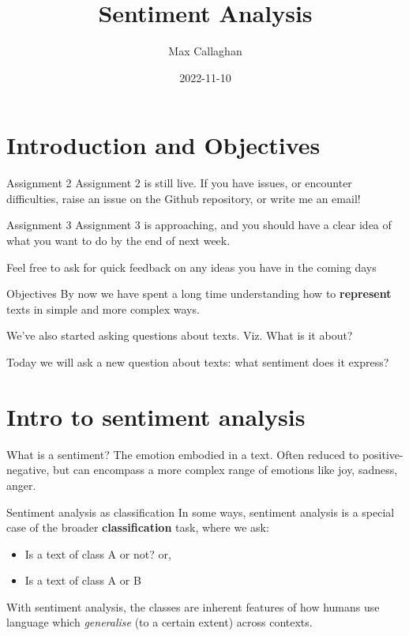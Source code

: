 \documentclass[
  10pt,
  ignorenonframetext,
  aspectratio=169]{beamer}
\title{Sentiment Analysis}
\author{Max Callaghan}
\date{2022-11-10}
\providecommand{\tightlist}{%
  \setlength{\itemsep}{0pt}\setlength{\parskip}{0pt}}
\begin{document}
\frame{\titlepage}

\hypertarget{introduction-and-objectives}{%
\section{Introduction and
Objectives}\label{introduction-and-objectives}}

\begin{frame}{Assignment 2}
\protect\hypertarget{assignment-2}{}
Assignment 2 is still live. If you have issues, or encounter
difficulties, raise an issue on the Github repository, or write me an
email!
\end{frame}

\begin{frame}{Assignment 3}
\protect\hypertarget{assignment-3}{}
Assignment 3 is approaching, and you should have a clear idea of what
you want to do by the end of next week.

Feel free to ask for quick feedback on any ideas you have in the coming
days
\end{frame}

\begin{frame}{Objectives}
\protect\hypertarget{objectives}{}
By now we have spent a long time understanding how to \textbf{represent}
texts in simple and more complex ways.

We've also started asking questions about texts. Viz. What is it about?

Today we will ask a new question about texts: what sentiment does it
express?
\end{frame}

\hypertarget{intro-to-sentiment-analysis}{%
\section{Intro to sentiment
analysis}\label{intro-to-sentiment-analysis}}

\begin{frame}{What is a sentiment?}
\protect\hypertarget{what-is-a-sentiment}{}
The emotion embodied in a text. Often reduced to positive-negative, but
can encompass a more complex range of emotions like joy, sadness, anger.
\end{frame}

\begin{frame}{Sentiment analysis as classification}
\protect\hypertarget{sentiment-analysis-as-classification}{}
In some ways, sentiment analysis is a special case of the broader
\textbf{classification} task, where we ask:

\begin{itemize}
\tightlist
\item
  Is a text of class A or not? or,
\item
  Is a text of class A or B
\end{itemize}

With sentiment analysis, the classes are inherent features of how humans
use language which \emph{generalise} (to a certain extent) across
contexts.
\end{frame}
\end{document}
